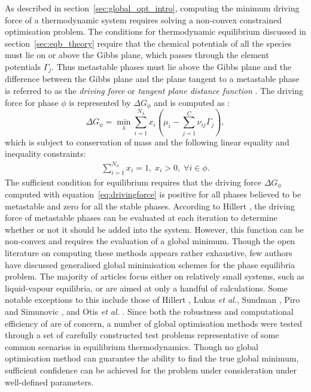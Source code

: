 	As described in section~\ref{sec:global_opt_intro}, computing the minimum driving force of a thermodynamic system requires solving a non-convex constrained optimisation problem. The conditions for thermodynamic equilibrium discussed in section~\ref{sec:eqb_theory} require that the chemical potentials of all the species must lie on or above the Gibbs plane, which passes through the element potentials $\Gamma_j$. Thus metastable phases must lie above the Gibbs plane and the difference between the Gibbs plane and the plane tangent to a metastable phase is referred to as the \emph{driving force} \cite{Lukas07} or \emph{tangent plane distance function} \cite{Lukas07,Zhang11}. The driving force for phase $\phi$ is represented by $\Delta G_{\phi}$ and is computed as \cite{Piro16}:
	\begin{equation}\label{eq:drivingforce}
        		\Delta G_{\phi}= \min_{\lambda} \sum_{i=1}^{N_{\lambda}}x_{i} \left (\mu_{i} - \sum_{j=1}^C \nu_{ij}\Gamma_j \right ),
    	\end{equation}
	which is subject to conservation of mass and the following linear equality and inequality constraints:
	\begin{align}
		\sum_{i=1}^{N_\phi} x_i = 1, \; x_i > 0, \; \forall i \in \phi.
	\end{align}
	The sufficient condition for equilibrium requires that the driving force $\Delta G_{\phi}$ computed with equation~\eqref{eq:drivingforce} is positive for all phases believed to be metastable and zero for all the stable phases. According to Hillert \cite{Hillert81}, the driving force of metastable phases can be evaluated at each iteration to determine whether or not it should be added into the system. However, this function can be non-convex and requires the evaluation of a global minimum. Though the open literature on computing these methods appears rather exhaustive, few authors have discussed generalised global minimisation schemes for the phase equilibria problem. The majority of articles focus either on relatively small systems, such as liquid-vapour equilibria, or are aimed at only a handful of calculations. Some notable exceptions to this include those of Hillert \cite{HILLERT198131}, Lukas \textit{et al.}\cite{LUKAS1982229}, Sundman \cite{Sundman15}, Piro and Simunovic \cite{Piro16}, and Otis \textit{et al.} \cite{Otis:2017ab}. Since both the robustness and computational efficiency of {\GEM} are of concern, a number of global optimisation methods were tested through a set of carefully constructed test problems representative of some common scenarios in equilibrium thermodynamics. Though no global optimisation method can guarantee the ability to find the true global minimum, sufficient confidence can be achieved for the problem under consideration under well-defined parameters.
	
